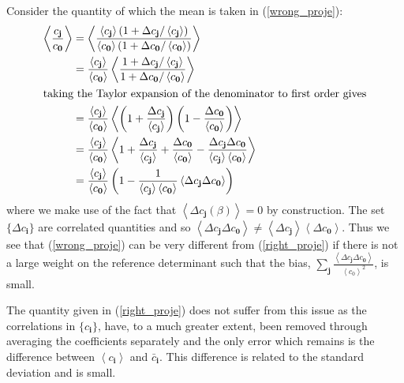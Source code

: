 \documentclass[a4paper, 12pt]{revtex4}
\newcommand{\bi}{\mathbf{i}}
\newcommand{\bj}{\mathbf{j}}
\newcommand{\bz}{\mathbf{0}}
\newcommand{\eref}[1]{(\ref{#1})}
\newcommand{\av}[1]{\left\langle#1\right\rangle}
\newcommand{\mean}[1]{\bar{#1}}
\begin{document}
Consider the quantity of which the mean is taken in \eref{wrong_proje}:
\begin{align}
\av{\frac{c_\bj}{c_\bz}} &= 
\av{ \frac{\av{c_\bj}(1+\Delta c_\bj/\av{c_\bj})}{\av{c_\bz}(1+\Delta c_\bz/\av{c_\bz})} }  \\
&= \frac{\av{c_\bj}}{\av{c_\bz}} \av{ \frac{1+\Delta c_\bj/\av{c_\bj}}{1+\Delta c_\bz/\av{c_\bz}} } \\
\intertext{taking the Taylor expansion of the denominator to first order gives}
&= \frac{\av{c_\bj}}{\av{c_\bz}} \av{ \left(1+\frac{\Delta c_\bj}{\av{c_\bj}}\right) \left(1-\frac{\Delta c_\bz}{\av{c_\bz}}\right) } \\
&= \frac{\av{c_\bj}}{\av{c_\bz}} \av{ 1 + \frac{\Delta c_\bj}{\av{c_\bj}} + \frac{\Delta c_\bz}{\av{c_\bz}} - \frac{\Delta c_\bj\Delta c_\bz}{\av{c_\bj}\av{c_\bz}} } \\
&= \frac{\av{c_\bj}}{\av{c_\bz}} \left( 1 - \frac{1}{\av{c_\bj}\av{c_\bz}}\av{\Delta c_\bj\Delta c_\bz} \right)
\end{align}
where we make use of the fact that $\av{\Delta c_\bj(\beta)} = 0$ by construction.  The set $\{\Delta c_\bi\}$ are correlated quantities and so $\av{\Delta c_\bj\Delta c_\bz} \neq \av{\Delta c_\bj}\av{\Delta c_\bz}$.  Thus we see that \eref{wrong_proje} can be very different from \eref{right_proje} if there is not a large weight on the reference determinant such that the bias, $\sum_\bj \frac{\av{\Delta c_\bj \Delta c_\bz}}{\av{c_0}^2}$, is small.

The quantity given in \eref{right_proje} does not suffer from this issue as the correlations in $\{c_\bi\}$, have, to a much greater extent, been removed through averaging the coefficients separately and the only error which remains is the difference between $\av{c_\bi}$ and $\mean{c}_\bi$.  This difference is related to the standard deviation and is small.
\end{document}
